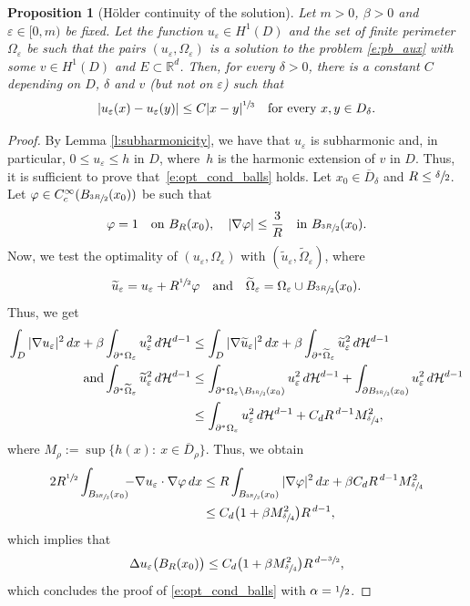 \documentclass[JEP,XML,SOM,Unicode]{cedram}
\theoremstyle{plain}
\newtheorem{prop}[teo]{Proposition}
\theoremstyle{definition}
\let\eps\varepsilon
\def\R{\mathbb{R}}
\def\HH{\mathcal{H}}
\begin{document}
\begin{prop}[Hölder continuity of the solution]\label{p:holder}
Let $m\!>\!0$, $\beta\!>\!0$ and $\eps\!\in\![0,m)$ be fixed. Let the function $u_\eps\in H^1(D)$ and the set of finite perimeter $\Omega_\eps$ be such that the pairs $(u_\eps,\Omega_\eps)$ is a solution to the problem \eqref{e:pb_aux} with some $v\in H^1(D)$ and $E\subset \R^d$. Then, for every $\delta>0$, there is a constant $C$ depending on $D$, $\delta$ and $v$ (but not on $\eps$) such that
\[|u_\eps(x)-u_\eps(y)|\le C|x-y|^{\sfrac13}\quad\text{for every } x,y\in D_\delta.\]
\end{prop}
\begin{proof}
By Lemma \ref{l:subharmonicity}, we have that $u_\eps$ is subharmonic and, in particular, $0\!\le\!u_\eps\!\le\!h$ in $D$, where~$h$ is the harmonic extension of $v$ in $D$. Thus, it is sufficient to prove that~\eqref{e:opt_cond_balls} holds. Let $x_0\in \overline D_\delta$ and $R\le \sfrac\delta2$. Let $\varphi\in C^\infty_c(B_{\sfrac{3R}2}(x_0))$ be such that
\[\varphi=1\quad\text{on } B_R(x_0),\quad |\nabla \varphi|\le \frac{3}{R}\quad\text{in } B_{\sfrac{3R}2}(x_0).\]
Now, we test the optimality of $(u_\eps,\Omega_\eps)$ with $(\widetilde u_\eps,\widetilde \Omega_\eps)$, where
\[\widetilde u_\eps=u_\eps+R^{\sfrac12}\varphi\quad\text{and}\quad \widetilde \Omega_\eps=\Omega_\eps\cup B_{\sfrac{3R}2}(x_0).\]
Thus, we get
\begin{align*}
\int_{D}|\nabla u_\eps|^2\,dx+\beta\int_{\partial^\ast\Omega_\eps}u_\eps^2\,d\HH^{d-1}&\le \int_{D}|\nabla \widetilde u_\eps|^2\,dx+\beta\int_{\partial^\ast\widetilde \Omega_\eps}\widetilde u_\eps^2\,d\HH^{d-1}\\
\tag*{and}
\int_{\partial^\ast\widetilde \Omega_\eps}\widetilde u_\eps^2\,d\HH^{d-1}&\le \int_{\partial^\ast \Omega_\eps\setminus B_{\sfrac{3R}2}(x_0)} u_\eps^2\,d\HH^{d-1}+\int_{\partial B_{\sfrac{3R}2}(x_0)} u_\eps^2\,d\HH^{d-1}\\
&\le \int_{\partial^\ast\Omega_\eps}u_\eps^2\,d\HH^{d-1}+C_d R^{\,d-1}M_{\sfrac{\delta}4}^2,
\end{align*}
where $M_\rho:=\sup\big\{h(x):\ x\in \overline D_\rho\big\}.$
Thus, we obtain
\begin{align*}
2R^{\sfrac12}\int_{B_{\sfrac{3R}2}(x_0)}\!\!\!-\nabla u_\eps\cdot\nabla \varphi\,dx&\le R\int_{B_{\sfrac{3R}2}(x_0)}|\nabla \varphi|^2\,dx+\beta C_dR^{\,d-1}M_{\sfrac{\delta}4}^2\\
&\le C_d\big(1+\beta M_{\sfrac{\delta}4}^2\big)R^{\,d-1},
\end{align*}
which implies that
\[\Delta u_\eps\big(B_R(x_0)\big)\le C_d\big(1+\beta M_{\sfrac{\delta}4}^2\big)R^{\,d-\sfrac32},\]
which concludes the proof of \eqref{e:opt_cond_balls} with $\alpha=\sfrac12$.
\end{proof}
\end{document}
